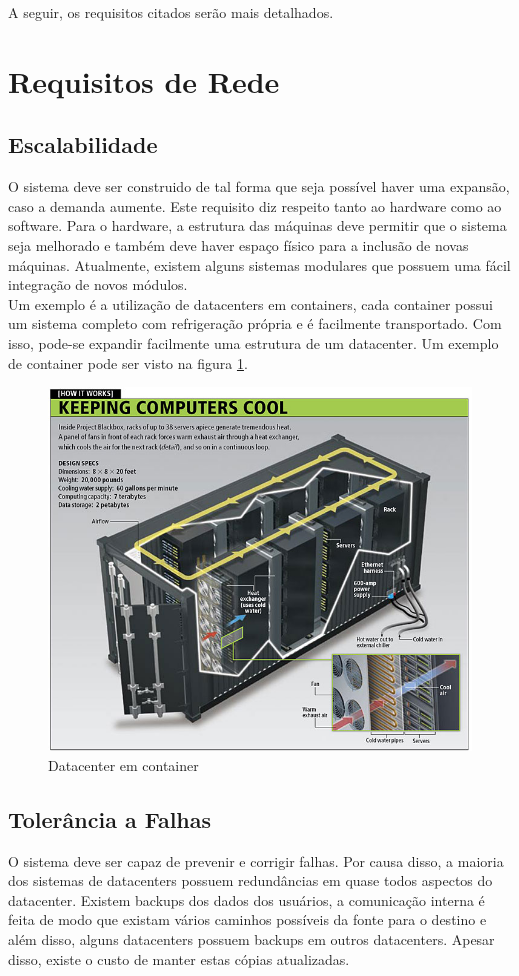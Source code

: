 \documentclass[12pt,a4paper]{report}
\begin{document}
A seguir, os requisitos citados serão mais detalhados.\\

\section{Requisitos de Rede}

\subsection{Escalabilidade}
O sistema deve ser construido de tal forma que seja possível haver uma expansão, caso a demanda aumente. Este requisito diz respeito tanto ao hardware como ao software. Para o hardware, a estrutura das máquinas deve permitir que o sistema seja melhorado e também deve haver espaço físico para a inclusão de novas máquinas. Atualmente, existem alguns sistemas modulares que possuem uma fácil integração de novos módulos.\\

Um exemplo é a utilização de datacenters em containers, cada container possui um sistema completo com refrigeração própria e é facilmente transportado. Com isso, pode-se expandir facilmente uma estrutura de um datacenter. Um exemplo de container pode ser visto na figura \ref{dc_container}.\\

\begin{figure}[H]
\centering
\includegraphics[width=.7\textwidth]{imagens/container_dc.jpg}
\caption{Datacenter em container}
\label{dc_container}
\end{figure}

\subsection{Tolerância a Falhas}
O sistema deve ser capaz de prevenir e corrigir falhas. Por causa disso, a maioria dos sistemas de datacenters possuem redundâncias em quase todos aspectos do datacenter. Existem backups dos dados dos usuários, a comunicação interna é feita de modo que existam vários caminhos possíveis da fonte para o destino e além disso, alguns datacenters possuem backups em outros datacenters. Apesar disso, existe o custo de manter estas cópias atualizadas.\\
\end{document}
